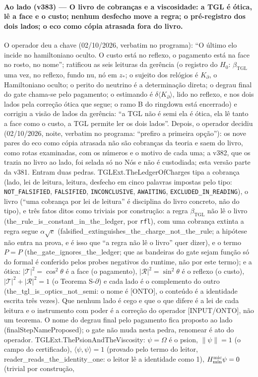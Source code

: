 \documentclass[11pt]{article}
\newcommand{\bTGL}{\beta_{\mathrm{TGL}}}\newcommand{\Msun}{M_{\odot}}\newcommand{\TGL}{\mathrm{TGL}}
\theoremstyle{definition}\newtheorem{deriv}{Derivação}
\begin{document}
\paragraph*{Ao lado (v383) --- O livro de cobranças e a viscosidade: a TGL é ótica, lê a face e o custo; nenhum desfecho move a regra; o pré-registro dos dois lados; o eco como cópia atrasada fora do livro.} O operador deu a chave (02/10/2026, verbatim no programa): ``O último elo incide no hamiltoniano oculto. O custo está no reflexo, o pagamento está na face no rosto, no nome''; ratificou as seis leituras da gerência (o registro do $H_0$: $\bTGL$ uma vez, no reflexo, fundo nu, nó em $z_*$; o sujeito dos relógios é $K_\partial$, o Hamiltoniano oculto; o perito do neutrino é a determinação direta; o degrau final do gate chama-se pelo pagamento; o estimando é $\delta\langle K_\partial\rangle$, lido no reflexo, e nos dois lados pela correção ótica que segue; o ramo B do ringdown está encerrado) e corrigiu a visão de lados da gerência: ``a TGL não é semi ela é ótica, ela lê tanto a face como o custo, a TGL permite ler os dois lados''. Depois, o operador decidiu (02/10/2026, noite, verbatim no programa: ``prefiro a primeira opção''): os nove pares do eco como cópia atrasada não são cobranças da teoria e saem do livro, como rotas examinadas, com os números e o motivo de cada uma; a v382, que os trazia no livro ao lado, foi selada só no Nós e não é custodiada; esta versão parte da v381. Entram duas pedras. \textsf{TGLExt.TheLedgerOfCharges} tipa a cobrança (lado, lei de leitura, leitura, desfecho em cinco palavras impostas pelo tipo: \texttt{NOT\_FALSIFIED}, \texttt{FALSIFIED}, \texttt{INCONCLUSIVE}, \texttt{AWAITING}, \texttt{EXCLUDED\_IN\_READING}), o livro (``uma cobrança por lei de leitura'' é disciplina do livro concreto, não do tipo), e três fatos ditos como triviais por construção: a regra $\bTGL$ não lê o livro (\textsf{the\_rule\_is\_constant\_in\_the\_ledger}, por \texttt{rfl}), com uma cobrança extinta a regra segue $\alpha\sqrt e$ (\textsf{falsified\_extinguishes\_the\_charge\_not\_the\_rule}; a hipótese não entra na prova, e é isso que ``a regra não lê o livro'' quer dizer), e o termo $P=P$ (\textsf{the\_gate\_ignores\_the\_ledger}; que as bandeiras do gate sejam função só do formal é conferido pelos probes negativos do runtime, não por este termo); e a ótica: $|\mathcal T|^2=\cos^2\theta$ é a face (o pagamento), $|\mathcal R|^2=\sin^2\theta$ é o reflexo (o custo), $|\mathcal T|^2+|\mathcal R|^2=1$ (o Teorema S-$\partial$) e cada lado é o complemento do outro (\textsf{the\_tgl\_is\_optics\_not\_semi}: o nome é \textsf{[ONTO]}, o conteúdo é a identidade escrita três vezes). Que nenhum lado é cego e que o que difere é a lei de cada leitura e o instrumento com poder é a correção do operador \textsf{[INPUT/ONTO]}, não um teorema. O nome do degrau final pelo pagamento fica proposto ao lado (\textsf{finalStepNameProposed}); o gate não muda nesta pedra, renomear é ato do operador. \textsf{TGLExt.ThePsionAndTheViscosity}: $\psi=\Omega$ é o psion, $\|\psi\|=1$ (o campo do certificado), $\langle\psi,\psi\rangle=1$ (provado pelo termo do leitor, \textsf{reader\_reads\_the\_identity\_one}: o leitor lê a identidade como 1), $H_{\min}^{\rm mic}\psi=0$ (trivial por construção, 
\end{document}
